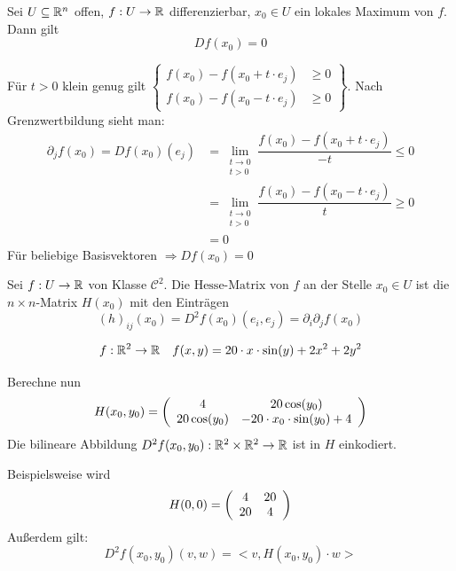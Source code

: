 \documentclass[main.tex]{subfiles}
\begin{document}
\begin{Theorem}
  Sei $U \subseteq \mathbb{R}^n$ offen, $f: U \to \mathbb{R}$ differenzierbar, $x_0 \in U$ ein lokales Maximum von $f$. Dann gilt
  $$Df(x_0) = 0$$
\end{Theorem}

\begin{Beweis}
  Für $t > 0$ klein genug gilt $\left\{\begin{aligned}
    f(x_0) - f(x_0 + t \cdot e_j) & \geq 0 \\
    f(x_0) - f(x_0 - t \cdot e_j) & \geq 0
  \end{aligned} \right\}$. Nach Grenzwertbildung sieht man:
  $$\begin{aligned}
    \partial_j f(x_0) = Df(x_0)(e_j) & = \lim \limits_{\substack{t\to 0 \\ t > 0}} \dfrac{f(x_0) - f(x_0 + t \cdot e_j)}{-t} \leq 0 \\
    & = \lim \limits_{\substack{t\to 0 \\ t > 0}} \dfrac{f(x_0) - f(x_0 - t \cdot e_j)}{t} \geq 0 \\
    & = 0
  \end{aligned}$$
  Für beliebige Basisvektoren $\Rightarrow Df(x_0) = 0$
\end{Beweis}

\begin{Definition}
  Sei $f:U \to \mathbb{R}$ von Klasse $\mathcal{C}^2$. Die $\text{Hesse-Matrix}$ von $f$ an der Stelle $x_0 \in U$ ist die $n \times n$-Matrix $H(x_0)$ mit den Einträgen
  $$(h)_{ij}(x_0) = D^2f(x_0)(e_i, e_j) = \partial_i \partial_j f(x_0)$$
\end{Definition}

\begin{Beispiel}
  $$f: \mathbb{R}^2 \to \mathbb{R} \quad f(x,y) = 20 \cdot x \cdot \sin(y) + 2x^2 + 2y^2$$
  \begin{center}
  \end{center}
  Berechne nun
  $$H(x_0,y_0) = \left(\begin{array}{c c}
    4 & 20 \cos(y_0)\\
    20\cos(y_0) & -20 \cdot x_0 \cdot \sin(y_0) + 4
  \end{array}\right)$$
  Die bilineare Abbildung $D^2 f(x_0,y_0): \mathbb{R}^2 \times \mathbb{R}^2 \to \mathbb{R}$ ist in $H$ einkodiert.

  Beispielsweise wird
  $$H(0,0) = \left(\begin{array}{c c}
    4 & 20\\
    20 & 4
  \end{array}\right)$$
  Außerdem gilt:
  $$D^2f(x_0,y_0)(v,w) = <v,H(x_0,y_0) \cdot w>$$
\end{Beispiel}
\end{document}
